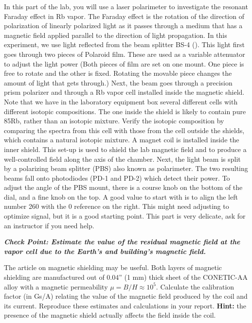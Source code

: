 \documentclass{../lab}
\begin{document}
In this part of the lab, you will use a laser polarimeter to investigate the resonant Faraday effect in Rb vapor. The Faraday effect is the rotation of the direction of polarization of linearly polarized light as it passes through a medium that has a magnetic field applied parallel to the direction of light propagation. In this experiment, we use light reflected from the beam splitter BS-4 (). This light first goes through two pieces of Polaroid film. These are used as a variable attenuator to adjust the light power (Both pieces of film are set on one mount. One piece is free to rotate and the other is fixed. Rotating the movable piece changes the amount of light that gets through.) Next, the beam goes through a precision prism polarizer and through a Rb vapor cell installed inside the magnetic shield. Note that we have in the laboratory equipment box several different cells with different isotopic compositions. The one inside the shield is likely to contain pure 85Rb, rather than an isotopic mixture. Verify the isotopic composition by comparing the spectra from this cell with those from the cell outside the shields, which contains a natural isotopic mixture. A magnet coil is installed inside the inner shield. This set-up is used to shield the lab magnetic field and to produce a well-controlled field along the axis of the chamber. Next, the light beam is split by a polarizing beam splitter (PBS) also known as polarimeter. The two resulting beams fall onto photodiodes (PD-1 and PD-2) which detect their power. To adjust the angle of the PBS mount, there is a course knob on the bottom of the dial, and a fine knob on the top. A good value to start with is to align the left number 260 with the 0 reference on the right. This might need adjusting to optimize signal, but it is a good starting point. This part is very delicate, ask for an instructor if you need help.

\emph{\textbf{Check Point: Estimate the value of the residual magnetic field at the vapor cell due to the Earth's and building's magnetic field.}}

The article on magnetic shielding may be useful. Both layers of magnetic shielding are manufactured out of 0.04'' (1 mm) thick sheet of the CONETIC-AA alloy with a magnetic permeability $\mu = B/H \approx 10^5$. Calculate the calibration factor (in Gs/A) relating the value of the magnetic field produced by the coil and its current. Reproduce these estimates and calculations in your report. \textbf{Hint:} the presence of the magnetic shield actually affects the field inside the coil.
\end{document}
